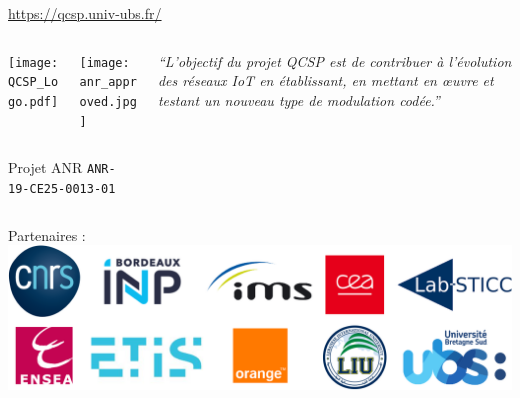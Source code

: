 \documentclass[../main.tex]{subfiles}
\begin{document}
\begin{frame}{\subsecname}{\href{https://qcsp.univ-ubs.fr/}{https://qcsp.univ-ubs.fr/}}

  \begin{columns}
    \begin{column}{.4\linewidth} \centering
      \begin{columns}
        \begin{column}{.4\linewidth}
          \texttt{[image: QCSP\_Logo.pdf]}
        \end{column}
        \begin{column}{.2\linewidth}
          \texttt{[image: anr\_approved.jpg]}
        \end{column}
      \end{columns}
      \small \vspace{5pt} Projet ANR \texttt{ANR-19-CE25-0013-01}
    \end{column}
    \begin{column}{.5\linewidth}
      \emph{``L'objectif du projet QCSP est de contribuer à l'évolution des réseaux IoT en établissant,
        en mettant en œuvre et testant un nouveau type de modulation codée.''}
    \end{column}
  \end{columns}

  \vspace{2 em}

  \begin{center}
    Partenaires :\\
    \includegraphics[width=0.6\linewidth]{figures/logos-thesis/partners-logos.png}
  \end{center}
\end{frame}
\end{document}
